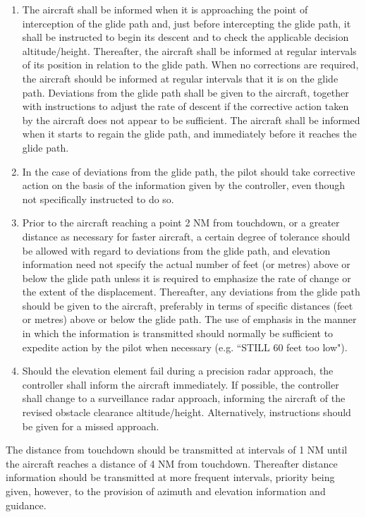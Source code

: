 \begin{enumeratesc}
\begin{enumerate}[labelindent=0pt,itemsep=0.2cm]
        \begin{enumerate}
            \item The aircraft shall be informed when it is approaching the point of interception of the glide path and, just before intercepting the glide path, it shall be instructed to begin its descent and to check the applicable decision altitude/height. Thereafter, the aircraft shall be informed at regular intervals of its position in relation to the glide path. When no corrections are required, the aircraft should be informed at regular intervals that it is on the glide path. Deviations from the glide path shall be given to the aircraft, together with instructions to adjust the rate of descent if the corrective action taken by the aircraft does not appear to be sufficient. The aircraft shall be informed when it starts to regain the glide path, and immediately before it reaches the glide path.
            \item In the case of deviations from the glide path, the pilot should take corrective action on the basis of the information given by the controller, even though not specifically instructed to do so.
            \item Prior to the aircraft reaching a point 2 NM from touchdown, or a greater distance as necessary for faster aircraft, a certain degree of tolerance should be allowed with regard to deviations from the glide path, and elevation information need not specify the actual number of feet (or metres) above or below the glide path unless it is required to emphasize the rate of change or the extent of the displacement. Thereafter, any deviations from the glide path should be given to the aircraft, preferably in terms of specific distances (feet or metres) above or below the glide path. The use of emphasis in the manner in which the information is transmitted should normally be sufficient to expedite action by the pilot when necessary (e.g. ``STILL 60 feet too low").
            \item Should the elevation element fail during a precision radar approach, the controller shall inform the aircraft immediately. If possible, the controller shall change to a surveillance radar approach, informing the aircraft of the revised obstacle clearance altitude/height. Alternatively, instructions should be given for a missed approach.
        \end{enumerate}

        \par\noindent The distance from touchdown should be transmitted at intervals of 1 NM until the aircraft reaches a distance of 4 NM from touchdown. Thereafter distance information should be transmitted at more frequent intervals, priority being given, however, to the provision of azimuth and elevation information and guidance.


\end{enumerate}
\end{enumeratesc}
